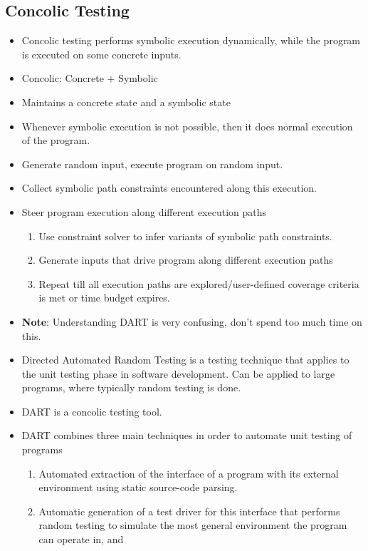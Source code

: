 \documentclass[a4paper]{article}
\begin{document}
\subsection{Concolic Testing}
\begin{itemize}
    \item Concolic testing performs symbolic execution dynamically, while the program is executed on some concrete inputs.
    \item Concolic: Concrete $+$ Symbolic
    \item Maintains a concrete state and a symbolic state
    \item Whenever symbolic execution is not possible, then it does normal execution of the program.
    \item Generate random input, execute program on random input.
    \item Collect symbolic path constraints encountered along this execution.
    \item Steer program execution along different execution paths
    \begin{enumerate}
        \item Use constraint solver to infer variants of symbolic path constraints.
        \item Generate inputs that drive program along different execution paths
        \item Repeat till all execution paths are explored/user-defined coverage criteria is met or time budget expires.
    \end{enumerate}
    \item \textbf{Note}: Understanding DART is very confusing, don't spend too much time on this.
    \item Directed Automated Random Testing is a testing technique that applies to the unit testing phase in software development. Can be applied to large programs, where typically random testing is done.
    \item DART is a concolic testing tool.
    \item DART combines three main techniques in order to automate unit testing of programs
    \begin{enumerate}
        \item Automated extraction of the interface of a program with its external environment using static source-code parsing.
        \item Automatic generation of a test driver for this interface that performs random testing to simulate the most general environment the program can operate in, and

\end{enumerate}
\end{itemize}
\end{document}
